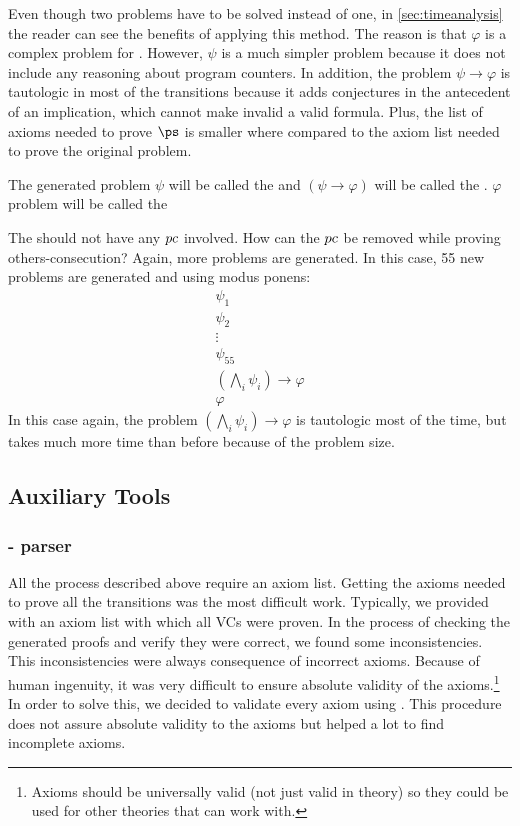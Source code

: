 Even though two \spass problems have to be solved instead of one, in \ref{sec:timeanalysis} the reader can see the benefits of applying this method.
%
The reason is that $\varphi$ is a complex problem for \spass. 
%
However, $\psi$ is a much simpler problem because it does not include any reasoning about program counters. 
In addition, the problem $\psi \to \varphi$ is tautologic in most of the transitions because it adds conjectures in the antecedent of an implication, which cannot make invalid a valid formula.
%
Plus, the list of axioms needed to prove $\ps$ is smaller where compared to the axiom list needed to prove the original problem.


The generated problem $\psi$ will be called the \textbf{\reducedProblem} and $(\psi \to \varphi)$ will be called the \textbf{\smallToBig}. $\varphi$ problem will be called the \textbf{\originalProblem}

The \reducedProblem  should not have any $pc$ involved. How can the $pc$ be removed while proving others-consecution?
%
Again, more \spass problems are generated. 
%
In this case, 55 new problems are generated and using modus ponens:
\[
	\begin{array}{l}
		\psi_1\\
		\psi_2\\
		\vdots\\
		\psi_{55}\\
		(\bigwedge_i \psi_i) \to \varphi\\\hline
		\varphi
	\end{array}
\]
In this case again, the \spass problem $(\bigwedge_i \psi_i) \to \varphi$ is tautologic most of the time, but \spass takes much more time than before because of the problem size.




\subsection{Auxiliary Tools}
\subsubsection{\ocaml - parser}
All the process described above require an axiom list. 
%
Getting the axioms needed to prove all the transitions was the most difficult work. 
%
Typically, we provided \spass with an axiom list with which all \gls{VC}s were proven. In the process of checking the generated proofs and verify they were correct, we found some inconsistencies. 
%
This inconsistencies were always consequence of incorrect axioms. 
%
Because of human ingenuity, it was very difficult to ensure absolute validity of the axioms.\footnote{Axioms should be universally valid (not just valid in \TLLpL theory) so they could be used for other theories that \leap can work with.}
%
In order to solve this, we decided to validate every axiom using \leap. 
%
This procedure does not assure absolute validity to the axioms but helped a lot to find incomplete axioms.

